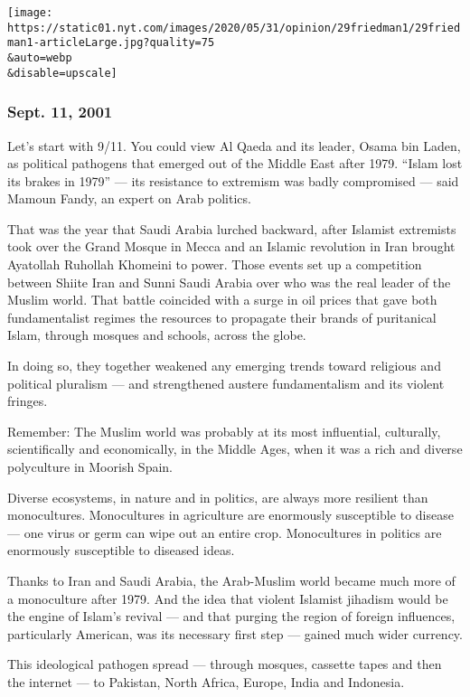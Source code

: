 \texttt{[image: https://static01.nyt.com/images/2020/05/31/opinion/29friedman1/29friedman1-articleLarge.jpg?quality=75\\\&auto=webp\\\&disable=upscale]}

\hypertarget{sept-11-2001}{%
\subsubsection{Sept. 11, 2001}\label{sept-11-2001}}

Let's start with 9/11. You could view Al Qaeda and its leader, Osama bin
Laden, as political pathogens that emerged out of the Middle East after
1979. ``Islam lost its brakes in 1979'' --- its resistance to extremism
was badly compromised --- said Mamoun Fandy, an expert on Arab politics.

That was the year that Saudi Arabia lurched backward, after Islamist
extremists took over the Grand Mosque in Mecca and an Islamic revolution
in Iran brought Ayatollah Ruhollah Khomeini to power. Those events set
up a competition between Shiite Iran and Sunni Saudi Arabia over who was
the real leader of the Muslim world. That battle coincided with a surge
in oil prices that gave both fundamentalist regimes the resources to
propagate their brands of puritanical Islam, through mosques and
schools, across the globe.

In doing so, they together weakened any emerging trends toward religious
and political pluralism --- and strengthened austere fundamentalism and
its violent fringes.

Remember: The Muslim world was probably at its most influential,
culturally, scientifically and economically, in the Middle Ages, when it
was a rich and diverse polyculture in Moorish Spain.

Diverse ecosystems, in nature and in politics, are always more resilient
than monocultures. Monocultures in agriculture are enormously
susceptible to disease --- one virus or germ can wipe out an entire
crop. Monocultures in politics are enormously susceptible to diseased
ideas.

Thanks to Iran and Saudi Arabia, the Arab-Muslim world became much more
of a monoculture after 1979. And the idea that violent Islamist jihadism
would be the engine of Islam's revival --- and that purging the region
of foreign influences, particularly American, was its necessary first
step --- gained much wider currency.

This ideological pathogen spread --- through mosques, cassette tapes and
then the internet --- to Pakistan, North Africa, Europe, India and
Indonesia.

